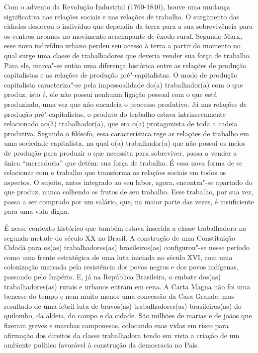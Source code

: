 Com o advento da Revolução Industrial (1760-1840), houve uma mudança
significativa nas relações sociais e nas relações de trabalho. O
surgimento das cidades deslocou o indivíduo que dependia da terra para a
sua sobrevivência para os centros urbanos no movimento acachapante de
êxodo rural. Segundo Marx, esse novo indivíduo urbano perdeu seu acesso
à terra a partir do momento no qual surge uma classe de trabalhadores
que deveria vender sua força de trabalho.
Para ele, marca"-se então uma diferença
histórica entre as relações de produção capitalistas e as relações de
produção pré"-capitalistas. O modo de produção capitalista caracteriza"-se
pela impessoalidade do(a) trabalhador(a) com o que produz, isto é, ele
não possui nenhuma ligação pessoal com o que está produzindo, uma vez
que não encadeia o processo produtivo. Já nas relações de produção
pré"-capitalistas, o produto do trabalho estava intrinsecamente
relacionado ao(à) trabalhador(a), que era o(a) protagonista de toda a
cadeia produtiva. Segundo o filósofo, essa característica rege as
relações de trabalho em uma sociedade capitalista, na qual o(a)
trabalhador(a) que não possui os meios de produção para produzir o que
necessita para sobreviver, passa a vender a única ``mercadoria'' que
detém: sua força de trabalho. É essa nova forma de se relacionar com o
trabalho que transforma as relações sociais em todos os aspectos. O
sujeito, antes integrado ao seu labor, agora, encontra"-se apartado do
que produz, nunca colhendo os frutos de seu trabalho. Esse trabalho, por
sua vez, passa a ser comprado por um salário, que, na maior parte das
vezes, é insuficiente para uma vida digna.

É nesse contexto histórico que também estava inserida a classe
trabalhadora na segunda metade do século XX no Brasil. A construção de
uma Constituição Cidadã para os(as) trabalhadores(as) brasileiros(as)
configurou"-se nesse período como uma frente estratégica de uma luta
iniciada no século XVI, com uma colonização marcada pela resistência dos
povos negros e dos povos indígenas, passando pelo Império. E, já na
República Brasileira, o embate dos(as) trabalhadores(as) rurais e
urbanos entram em cena. A Carta Magna não foi uma benesse do tempo e nem
muito menos uma concessão da Casa Grande, mas resultado de uma febril
luta de bravos(as) trabalhadores(as) brasileiros(as) do quilombo, da
aldeia, do campo e da cidade. São milhões de marias e de joãos que
fizeram greves e marchas camponesas, colocando suas vidas em risco para
afirmação dos direitos da classe trabalhadora tendo em vista a criação
de um ambiente político favorável à construção da democracia no País.

